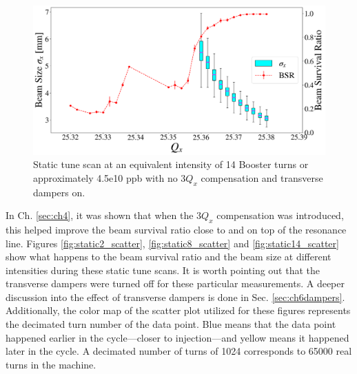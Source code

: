 \begin{figure}[H]
    \centering
    \includegraphics[width=\columnwidth]{chapter6/static14turns_BARE_dampersON.png}
    \caption{Static tune scan at an equivalent intensity of 14 Booster turns or approximately 4.5e10 ppb with no $3Q_x$ compensation and transverse dampers on.}
    \label{fig:static14_bare}
   \vspace{-1.25em}
\end{figure}

In Ch. \ref{sec:ch4}, it was shown that when the $3Q_x$ compensation was introduced, this helped improve the beam survival ratio close to and on top of the resonance line. Figures \ref{fig:static2_scatter}, \ref{fig:static8_scatter} and \ref{fig:static14_scatter} show what happens to the beam survival ratio and the beam size at different intensities during these static tune scans. It is worth pointing out that the transverse dampers were turned off for these particular measurements. A deeper discussion into the effect of transverse dampers is done in Sec. \ref{sec:ch6dampers}. Additionally, the color map of the scatter plot utilized for these figures represents the decimated turn number of the data point. Blue means that the data point happened earlier in the cycle---closer to injection---and yellow means it happened later in the cycle. A decimated number of turns of 1024 corresponds to 65000 real turns in the machine.


